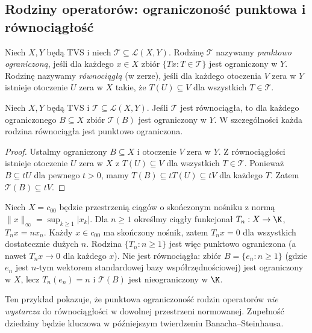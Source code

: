 \subsection{Rodziny operatorów: ograniczoność punktowa i równociągłość}

\begin{definicja}
\label{def:operator-family}
Niech $X,Y$ będą TVS i niech
$\mathcal T\subseteq\mathcal L(X,Y)$.
Rodzinę $\mathcal T$ nazywamy \emph{punktowo ograniczoną}, jeśli
dla każdego $x\in X$ zbiór $\{Tx:T\in\mathcal T\}$
jest ograniczony w $Y$. Rodzinę nazywamy
\emph{równociągłą} (w zerze), jeśli dla każdego otoczenia
$V$ zera w $Y$ istnieje otoczenie $U$ zera w $X$ takie,
że $T(U)\subseteq V$ dla wszystkich $T\in\mathcal T$.
\end{definicja}

\begin{twierdzenie}
\label{thm:equi-bounded}
Niech $X,Y$ będą TVS i $\mathcal T\subseteq\mathcal L(X,Y)$.
Jeśli $\mathcal T$ jest równociągła, to dla każdego
ograniczonego $B\subseteq X$ zbiór $\mathcal T(B)$
jest ograniczony w $Y$. W szczególności każda rodzina
równociągła jest punktowo ograniczona.
\end{twierdzenie}
\begin{proof}
Ustalmy ograniczony $B\subseteq X$ i otoczenie $V$ zera
w $Y$. Z równociągłości istnieje otoczenie $U$ zera
w $X$ z $T(U)\subseteq V$ dla wszystkich $T\in\mathcal T$.
Ponieważ $B\subseteq tU$ dla pewnego $t>0$, mamy
$T(B)\subseteq tT(U)\subseteq tV$ dla każdego $T$.
Zatem $\mathcal T(B)\subseteq tV$.
\end{proof}

\begin{przyklad}
\label{ex:c00-uniform-boundedness-failure}
Niech $X=c_{00}$ będzie przestrzenią ciągów o skończonym
nośniku z normą $\|x\|_\infty=\sup_{k\ge1}|x_k|$.
Dla $n\ge1$ określmy ciągły funkcjonał
$T_n:X\to\K$, $T_nx=nx_n$. Każdy $x\in c_{00}$
ma skończony nośnik, zatem $T_nx=0$ dla wszystkich
dostatecznie dużych $n$. Rodzina $\{T_n:n\ge1\}$
jest więc punktowo ograniczona (a nawet $T_nx\to0$
dla każdego $x$). Nie jest równociągła: zbiór
$B=\{e_n:n\ge1\}$ (gdzie $e_n$ jest $n$-tym wektorem
standardowej bazy współrzędnościowej) jest ograniczony w $X$, lecz
$T_n(e_n)=n$ i $\mathcal T(B)$ jest nieograniczony w $\K$.

Ten przykład pokazuje, że punktowa ograniczoność rodzin
operatorów \emph{nie wystarcza} do równociągłości w dowolnej
przestrzeni normowanej. Zupełność dziedziny będzie kluczowa
w późniejszym twierdzeniu Banacha--Steinhausa.
\end{przyklad}

